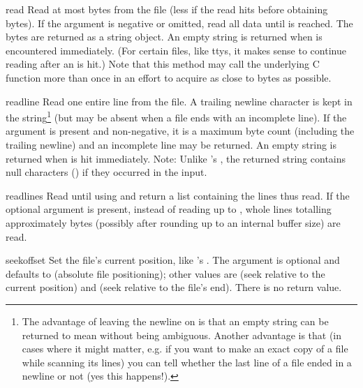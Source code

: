 \begin{methoddesc}[file]{read}{}
  Read at most  bytes from the file (less if the read hits
  \EOF{} before obtaining  bytes).  If the 
  argument is negative or omitted, read all data until \EOF{} is
  reached.  The bytes are returned as a string object.  An empty
  string is returned when \EOF{} is encountered immediately.  (For
  certain files, like ttys, it makes sense to continue reading after
  an \EOF{} is hit.)  Note that this method may call the underlying
  C function  more than once in an effort to
  acquire as close to  bytes as possible.
\end{methoddesc}

\begin{methoddesc}[file]{readline}{}
  Read one entire line from the file.  A trailing newline character is
  kept in the string\footnote{
	The advantage of leaving the newline on is that an empty string 
	can be returned to mean \EOF{} without being ambiguous.  Another 
	advantage is that (in cases where it might matter, e.g. if you 
	want to make an exact copy of a file while scanning its lines) 
	you can tell whether the last line of a file ended in a newline
	or not (yes this happens!).
  } (but may be absent when a file ends with an
  incomplete line).  If the  argument is present and
  non-negative, it is a maximum byte count (including the trailing
  newline) and an incomplete line may be returned.
  An empty string is returned when \EOF{} is hit
  immediately.  Note: Unlike 's , the returned
  string contains null characters () if they occurred in the
  input.
\end{methoddesc}

\begin{methoddesc}[file]{readlines}{}
  Read until \EOF{} using  and return a list containing
  the lines thus read.  If the optional  argument is
  present, instead of reading up to \EOF{}, whole lines totalling
  approximately  bytes (possibly after rounding up to an
  internal buffer size) are read.
\end{methoddesc}

\begin{methoddesc}[file]{seek}{offset}
  Set the file's current position, like 's .
  The  argument is optional and defaults to 
  (absolute file positioning); other values are  (seek
  relative to the current position) and  (seek relative to the
  file's end).  There is no return value.
\end{methoddesc}

